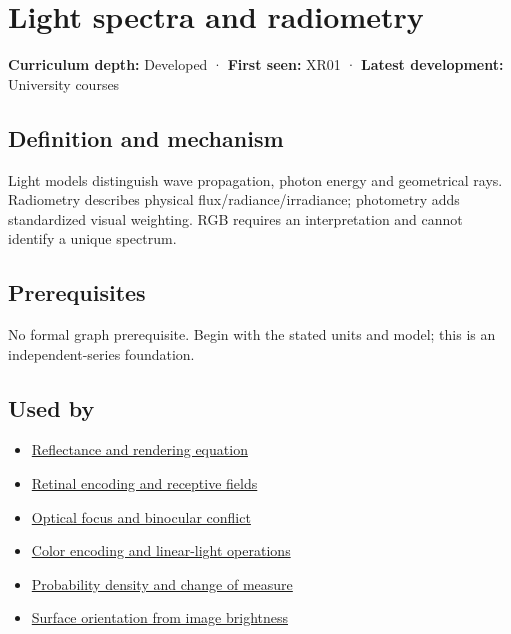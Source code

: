 \hypertarget{appendix-215c2570199b}{}\label{referencestart:appendix-215c2570199b}
\section{Light spectra and radiometry}\label{appendix-215c2570199b-light-spectra-and-radiometry}

\textbf{Curriculum depth:} Developed · \textbf{First seen:} XR01 · \textbf{Latest development:} University courses

\subsection{Definition and mechanism}\label{appendix-215c2570199b-definition-and-mechanism}

Light models distinguish wave propagation, photon energy and geometrical rays. Radiometry describes physical flux/radiance/irradiance; photometry adds standardized visual weighting. RGB requires an interpretation and cannot identify a unique spectrum.

\subsection{Prerequisites}\label{appendix-215c2570199b-prerequisites}

No formal graph prerequisite. Begin with the stated units and model; this is an independent-series foundation.

\subsection{Used by}\label{appendix-215c2570199b-used-by}

\begin{itemize}
\tightlist
\item
  \hyperref[appendix-96da0b153b77]{Reflectance and rendering equation}
\item
  \hyperref[appendix-7281c15ac44a]{Retinal encoding and receptive fields}
\item
  \hyperref[appendix-f90cee1be7a4]{Optical focus and binocular conflict}
\item
  \hyperref[appendix-a9f83ad40792]{Color encoding and linear-light operations}
\item
  \hyperref[appendix-4815cd87ab8b]{Probability density and change of measure}
\item
  \hyperref[appendix-89b2d5b7c9e1]{Surface orientation from image brightness}
\end{itemize}

